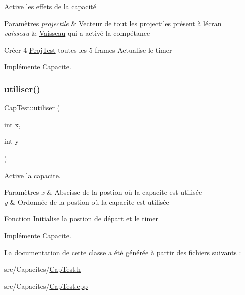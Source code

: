 Active les effets de la capacité 


\begin{DoxyParams}{Paramètres}
{\em projectile} & Vecteur de tout les projectiles présent à l\textquotesingle{}écran \\
\hline
{\em vaisseau} & \hyperlink{class_vaisseau}{Vaisseau} qui a activé la compétance\\
\hline
\end{DoxyParams}
Créer 4 \hyperlink{class_proj_test}{Proj\+Test} toutes les 5 frames Actualise le timer 

Implémente \hyperlink{class_capacite_a924214972f385ef409031bafc0f315b7}{Capacite}.

\mbox{\label{class_cap_test_a9c85a17dec6cf78f1438b08b175f650d}} 
\subsubsection{\texorpdfstring{utiliser()}{utiliser()}}
{\footnotesize\ttfamily Cap\+Test\+::utiliser (\begin{DoxyParamCaption}\item[{int}]{x,  }\item[{int}]{y }\end{DoxyParamCaption})\hspace{0.3cm}{\ttfamily [virtual]}}



Active la capacite. 


\begin{DoxyParams}{Paramètres}
{\em x} & Abscisse de la postion où la capacite est utilisée \\
\hline
{\em y} & Ordonnée de la postion où la capacite est utilisée\\
\hline
\end{DoxyParams}
Fonction Initialise la postion de départ et le timer 

Implémente \hyperlink{class_capacite_a6f5e6efda11f80ab8538e23f5bdc6e79}{Capacite}.



La documentation de cette classe a été générée à partir des fichiers suivants \+:\begin{DoxyCompactItemize}
\item 
src/\+Capacites/\hyperlink{_cap_test_8h}{Cap\+Test.\+h}\item 
src/\+Capacites/\hyperlink{_cap_test_8cpp}{Cap\+Test.\+cpp}\end{DoxyCompactItemize}
